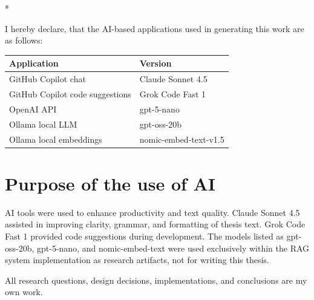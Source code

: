 \begin{aidisclaimer} * %

    I hereby declare, that the AI-based applications used in generating this work are as follows:

    \begin{center}
        \begin{tabularx}{\linewidth}{X|l}
            \toprule
            \textbf{Application}                                                     & \textbf{Version}                                               \\
            \midrule
            GitHub Copilot chat \parencite{githubAskingGitHubCopilota}               & Claude Sonnet 4.5 \parencite{anthropicIntroducingClaudeSonnet} \\
            GitHub Copilot code suggestions \parencite{githubGettingCodeSuggestions} & Grok Code Fast 1 \parencite{xaiGrokCodeFast}                   \\
            OpenAI API    \parencite{APIPlatformOpenAI}                              & gpt-5-nano \parencite{openaiGPT5NanoModel}                     \\
            Ollama local LLM  \parencite{Ollama}                                     & gpt-oss-20b \parencite{openaiGptoss20bModelOpenAI}             \\
            Ollama local embeddings \parencite{Ollama}                               & nomic-embed-text-v1.5 \parencite{nomicUnboxingNomicEmbed}      \\
            \bottomrule
        \end{tabularx}
    \end{center}

    \section*{Purpose of the use of AI}

    AI tools were used to enhance productivity and text quality. Claude Sonnet 4.5 assisted in improving clarity, grammar, and formatting of thesis text. Grok Code Fast 1 provided code suggestions during development. The models listed as gpt-oss-20b, gpt-5-nano, and nomic-embed-text were used exclusively within the RAG system implementation as research artifacts, not for writing this thesis.

    All research questions, design decisions, implementations, and conclusions are my own work.

\end{aidisclaimer}
